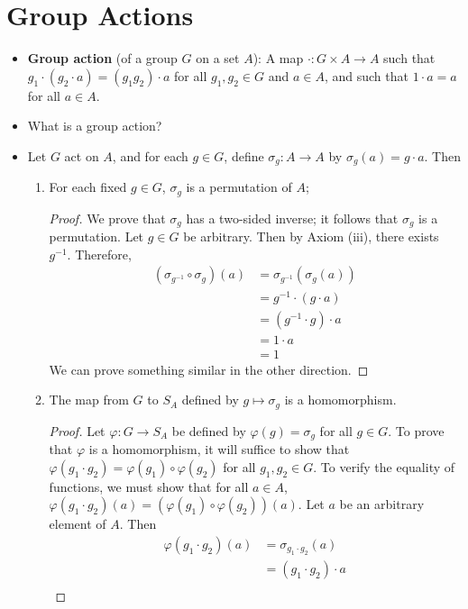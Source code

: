 \documentclass[../notes.tex]{subfiles}
\begin{document}
\section{Group Actions}
\begin{itemize}
    \item \textbf{Group action} (of a group $G$ on a set $A$): A map $\cdot:G\times A\to A$ such that $g_1\cdot(g_2\cdot a)=(g_1g_2)\cdot a$ for all $g_1,g_2\in G$ and $a\in A$, and such that $1\cdot a=a$ for all $a\in A$.
    \item What is a group action?
    \item Let $G$ act on $A$, and for each $g\in G$, define $\sigma_g:A\to A$ by $\sigma_g(a)=g\cdot a$. Then
    \begin{enumerate}
        \item For each fixed $g\in G$, $\sigma_g$ is a permutation of $A$;
        \begin{proof}
            We prove that $\sigma_g$ has a two-sided inverse; it follows that $\sigma_g$ is a permutation. Let $g\in G$ be arbitrary. Then by Axiom (iii), there exists $g^{-1}$. Therefore,
            \begin{align*}
                (\sigma_{g^{-1}}\circ\sigma_g)(a) &= \sigma_{g^{-1}}(\sigma_g(a))\\
                &= g^{-1}\cdot(g\cdot a)\\
                &= (g^{-1}\cdot g)\cdot a\\
                &= 1\cdot a\\
                &= 1
            \end{align*}
            We can prove something similar in the other direction.
        \end{proof}
        \item The map from $G$ to $S_A$ defined by $g\mapsto\sigma_g$ is a homomorphism.
        \begin{proof}
            Let $\varphi:G\to S_A$ be defined by $\varphi(g)=\sigma_g$ for all $g\in G$. To prove that $\varphi$ is a homomorphism, it will suffice to show that $\varphi(g_1\cdot g_2)=\varphi(g_1)\circ\varphi(g_2)$ for all $g_1,g_2\in G$. To verify the equality of functions, we must show that for all $a\in A$, $\varphi(g_1\cdot g_2)(a)=(\varphi(g_1)\circ\varphi(g_2))(a)$. Let $a$ be an arbitrary element of $A$. Then
            \begin{align*}
                \varphi(g_1\cdot g_2)(a) &= \sigma_{g_1\cdot g_2}(a)\\
                &= (g_1\cdot g_2)\cdot a\\

\end{align*}
\end{proof}
\end{enumerate}
\end{itemize}
\end{document}
